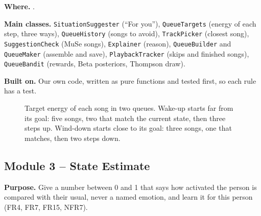 \documentclass[conference]{IEEEtran}
\newcommand{\field}[1]{\noindent\textbf{#1}}
\begin{document}
\field{Where.} .

\field{Main classes.} \texttt{SituationSuggester} (``For you''), \texttt{QueueTargets} (energy of each step, three ways), \texttt{QueueHistory} (songs to avoid), \texttt{TrackPicker} (closest song), \texttt{SuggestionCheck} (MuSe songs), \texttt{Explainer} (reason), \texttt{QueueBuilder} and \texttt{QueueMaker} (assemble and save), \texttt{PlaybackTracker} (skips and finished songs), \texttt{QueueBandit} (rewards, Beta posteriors, Thompson draw).

\field{Built on.} Our own code, written as pure functions and tested first, so each rule has a test.

\begin{figure}[!t]
\centering
{}
\caption{Target energy of each song in two queues. Wake-up starts far from its goal: five songs, two that match the current state, then three steps up. Wind-down starts close to its goal: three songs, one that matches, then two steps down.}
\label{fig:queue}
\end{figure}

\subsection{Module 3 -- State Estimate}
\field{Purpose.} Give a number between 0 and 1 that says how activated the person is compared with their usual, never a named emotion, and learn it for this person (FR4, FR7, FR15, NFR7).
\end{document}
